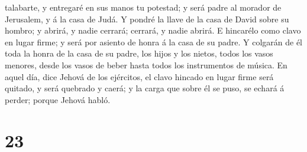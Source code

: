 talabarte, y entregaré en sus manos tu potestad; y será padre al morador
de Jerusalem, y á la casa de Judá.  Y pondré la llave de la
casa de David sobre su hombro; y abrirá, y nadie cerrará; cerrará, y
nadie abrirá.  E hincarélo como clavo en lugar firme; y
será por asiento de honra á la casa de su padre.  Y
colgarán de él toda la honra de la casa de su padre, los hijos y los
nietos, todos los vasos menores, desde los vasos de beber hasta todos
los instrumentos de música.  En aquel día, dice Jehová de
los ejércitos, el clavo hincado en lugar firme será quitado, y será
quebrado y caerá; y la carga que sobre él se puso, se echará á perder;
porque Jehová habló.

\hypertarget{section-22}{%
\section{23}\label{section-22}}

